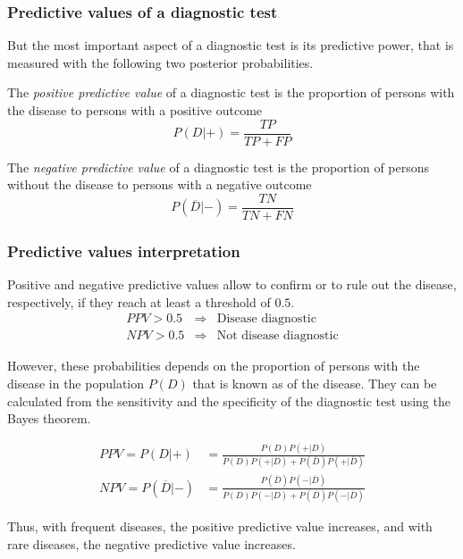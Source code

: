 \begin{frame}
\frametitle{Predictive values of a diagnostic test}
But the most important aspect of a diagnostic test is its predictive power, that is measured with the following two posterior probabilities.
\begin{definition}
The \emph{positive predictive value} of a diagnostic test is the proportion of persons with the disease to persons with a positive outcome
\[
P(D|+) = \frac{TP}{TP+FP}
\]
\end{definition}

\begin{definition}
The \emph{negative predictive value} of a diagnostic test is the proportion of persons without the disease to persons with a negative outcome 
\[
P(\overline{D}|-) = \frac{TN}{TN+FN}
\]
\end{definition}
\end{frame}


\begin{frame}
\frametitle{Predictive values interpretation}
Positive and negative predictive values allow to confirm or to rule out the disease, respectively, if they reach at least a threshold of $0.5$.
\[
\begin{array}{rcl}
PPV>0.5 & \Rightarrow & \mbox{Disease diagnostic}\\
NPV>0.5 & \Rightarrow & \mbox{Not disease diagnostic} 
\end{array}
\]

However, these probabilities depends on the proportion of persons with the disease in the population $P(D)$ that is known as  of the disease.
They can be calculated from the sensitivity and the specificity of the diagnostic test using the Bayes theorem.

\begin{align*}
PPV=P(D|+) &= \frac{P(D)P(+|D)}{P(D)P(+|D)+P(\overline{D})P(+|\overline{D})}\\
NPV=P(\overline{D}|-) &= \frac{P(\overline{D})P(-|\overline{D})}{P(D)P(-|D)+P(\overline{D})P(-|\overline{D})}
\end{align*} 

Thus, with frequent diseases, the positive predictive value increases, and with rare diseases, the negative predictive value increases. 
\end{frame}


